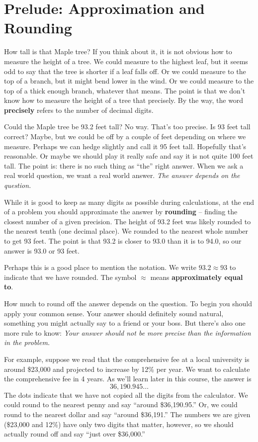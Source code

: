
\section{Prelude: Approximation and Rounding} 

How tall is that Maple tree?  If you think about it, it is not obvious how to measure the height of a tree. We could measure to the highest leaf, but it seems odd to say that the tree is shorter if a leaf falls off.  Or we could measure to the top of a branch, but it might bend lower in the wind.  Or we could measure to the top of a thick enough branch, whatever that means.  The point is that we don't know how to measure the height of a tree that precisely.  By the way, the word \textbf{precisely} refers to the number of decimal digits.

Could the Maple tree be 93.2 feet tall?  No way.  That's too precise.  Is 93 feet tall correct?  Maybe, but we could be off by a couple of feet depending on where we measure. Perhaps we can hedge %
slightly and call it 95 feet tall.  Hopefully that's reasonable.  Or maybe we should play it really safe and say it is not quite 100 feet tall.  The point is: there is no such thing as ``the'' right answer.  When we ask a real world question, we want a real world answer. \emph{The answer depends on the question.} 

While it is good to keep as many digits as possible during calculations, at the end of a problem you should approximate the answer by \textbf{rounding} -- finding the closest number of a given precision.  The height of 93.2 feet was likely rounded to the nearest tenth (one decimal place).  We rounded to the nearest whole number to get 93 feet.  The point is that 93.2 is closer to 93.0 than it is to 94.0, so our answer is 93.0 or 93 feet.


Perhaps this is a good place to mention the notation.  We write $93.2 \approx 93$ to indicate that we have rounded.  The symbol $\approx$ means \textbf{approximately equal to}.

How much to round off the answer depends on the question.  To begin you should apply your common sense.  Your answer should definitely sound natural, something you might actually say to a friend or your boss.  But there's also one more rule to know: 
\emph{Your answer should not be more precise than the information in the problem.}

For example, suppose we read that the comprehensive fee at a local university is around \$23,000 and projected to increase by 12\% per year.  We want to calculate the comprehensive fee in 4 years.  As we'll learn later in this course, the answer is 
$$36,190.945\ldots$$
The dots indicate that we have not copied all the digits from the calculator.
We could round to the nearest penny and say ``around \$36,190.95.''  Or, we could round to the nearest dollar and say ``around \$36,191.'' The numbers we are given (\$23,000 and 12\%) have only two digits that matter, however, so we should actually round off and say ``just over \$36,000.'' 

